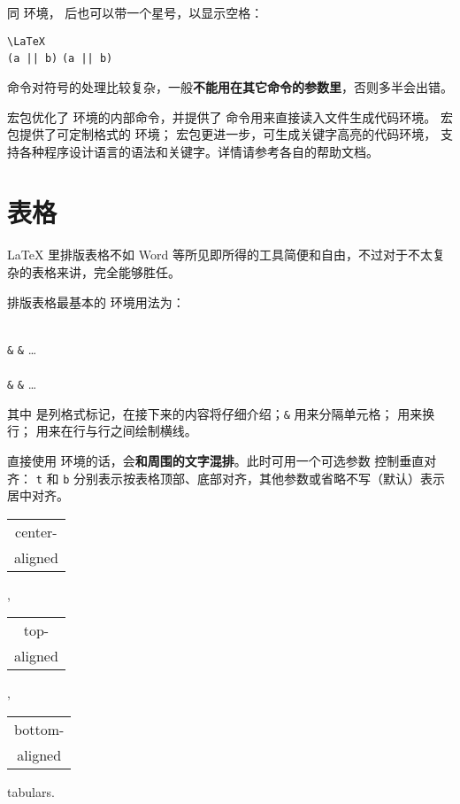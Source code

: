 同  环境， 后也可以带一个星号，以显示空格：
\begin{example}
\verb|\LaTeX| \\
\verb+(a || b)+ \verb*+(a || b)+
\end{example}

 命令对符号的处理比较复杂，一般\textbf{不能用在其它命令的参数里}，否则多半会出错。

 宏包优化了  环境的内部命令，并提供了  命令用来直接读入文件生成代码环境。
 宏包提供了可定制格式的  环境； 宏包更进一步，可生成关键字高亮的代码环境，
支持各种程序设计语言的语法和关键字。详情请参考各自的帮助文档。

\section{表格}\label{sec:tabular}

\LaTeX{} 里排版表格不如 Word 等所见即所得的工具简便和自由，不过对于不太复杂的表格来讲，完全能够胜任。

排版表格最基本的  环境用法为：
\begin{command}
\\
  \texttt\&  \texttt\& \ldots\ \crcmd \\
  \\
  \texttt\&  \texttt\& \ldots\ \crcmd \\
\end{command}
其中  是列格式标记，在接下来的内容将仔细介绍；\texttt\& 用来分隔单元格；
\crcmd{} 用来换行； 用来在行与行之间绘制横线。

直接使用  环境的话，会\textbf{和周围的文字混排}。此时可用一个可选参数  控制垂直对齐：
\verb|t| 和 \verb|b| 分别表示按表格顶部、底部对齐，其他参数或省略不写（默认）表示居中对齐。
\begin{example}
\begin{tabular}{|c|}
  center-\\ aligned \\
\end{tabular},
\begin{tabular}[t]{|c|}
  top-\\ aligned \\
\end{tabular},
\begin{tabular}[b]{|c|}
  bottom-\\ aligned\\
\end{tabular} tabulars.
\end{example}

